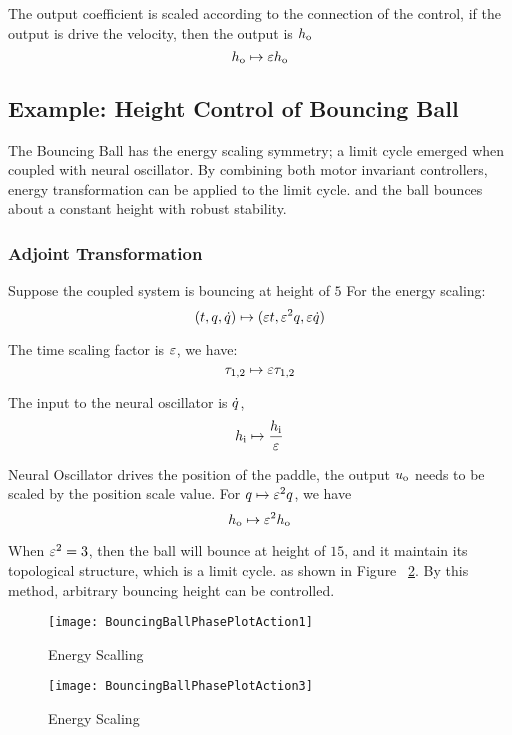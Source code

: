 The output coefficient is scaled according to the connection of the control, 
if the output is drive the velocity, then the output is $h_{\mathrm{o}}$
\[
h_{\mathrm{o}} \mapsto \varepsilon h_{\mathrm{o}}
\]




\subsection{Example: Height Control of Bouncing Ball}

The Bouncing Ball has the energy scaling symmetry; a limit cycle emerged when coupled with neural oscillator.
By combining both motor invariant controllers, energy transformation can be applied to the limit cycle.
and the ball  bounces about a constant height with robust stability.

\subsubsection*{Adjoint Transformation}
Suppose the coupled system is bouncing at height of $5$
For the energy scaling:
\[
(t,q,\dot{q} ) \mapsto ( \varepsilon t ,\varepsilon^2 q,\varepsilon \dot{q})
\]


The time scaling factor is $\varepsilon$, we have:
\[
\tau_{1,2} \mapsto \varepsilon \tau_{1,2}
\]

The input to the neural oscillator is $\dot{q}$,
\[
h_{\mathrm{i}} \mapsto \frac{h_{\mathrm{i}}}{\varepsilon}
\]
 
Neural Oscillator drives the position of the paddle, the output $u_{\mathrm{o}}$ needs to be scaled by the position scale value.
For $q \mapsto \varepsilon^2q$, we have
\[
 h_{\mathrm{o}} \mapsto \varepsilon^2 h_{\mathrm{o}}
\]

When $\varepsilon^2=3$, then the ball will bounce at height of $15$, and it maintain its topological structure, which is a limit cycle.
as shown in Figure ~\ref{fig:energy3}. 
By this method, arbitrary bouncing height can be controlled.


\begin{figure}[!htbp]
  \begin{center}
   	\texttt{[image: BouncingBallPhasePlotAction1]}
    \caption{Energy Scalling}
    \label{fig:energy1}
  \end{center}
\end{figure} 


\begin{figure}[!htbp]
  \begin{center}
	\texttt{[image: BouncingBallPhasePlotAction3]}
    \caption{Energy Scaling}
    \label{fig:energy3}
  \end{center}
\end{figure}


